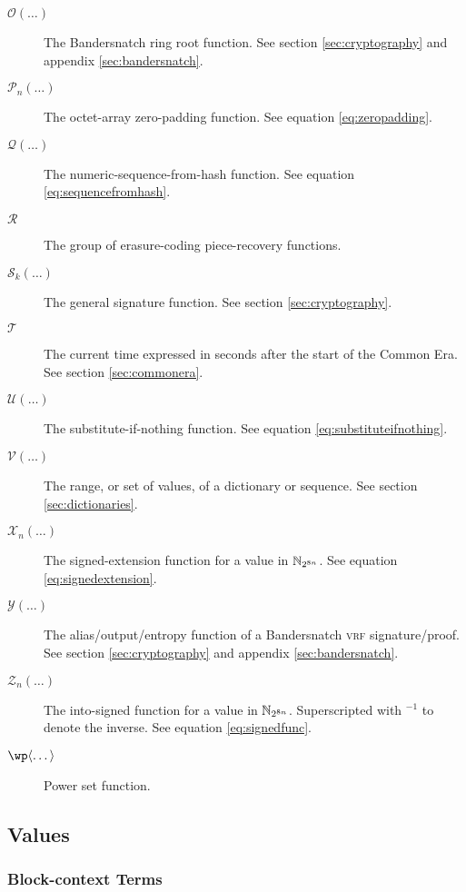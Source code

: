 \begin{description}
  \item[$\mathcal{O}(\dots)$] The Bandersnatch ring root function. See section \ref{sec:cryptography} and appendix \ref{sec:bandersnatch}.
  \item[$\mathcal{P}_n(\dots)$] The octet-array zero-padding function. See equation \ref{eq:zeropadding}.
  \item[$\mathcal{Q}(\dots)$] The numeric-sequence-from-hash function. See equation \ref{eq:sequencefromhash}.
  \item[$\mathcal{R}$] The group of erasure-coding piece-recovery functions.
  \item[$\mathcal{S}_k(\dots)$] The general signature function. See section \ref{sec:cryptography}.
  \item[$\mathcal{T}$] The current time expressed in seconds after the start of the \Jam Common Era. See section \ref{sec:commonera}.
  \item[$\mathcal{U}(\dots)$] The substitute-if-nothing function. See equation \ref{eq:substituteifnothing}.
  \item[$\mathcal{V}(\dots)$] The range, or set of values, of a dictionary or sequence. See section \ref{sec:dictionaries}.
  \item[$\mathcal{X}_n(\dots)$] The signed-extension function for a value in $\mathbb{N}_{2^{8n}}$. See equation \ref{eq:signedextension}.
  \item[$\mathcal{Y}(\dots)$] The alias/output/entropy function of a Bandersnatch \textsc{vrf} signature/proof. See section \ref{sec:cryptography} and appendix \ref{sec:bandersnatch}.
  \item[$\mathcal{Z}_n(\dots)$] The into-signed function for a value in $\mathbb{N}_{2^{8n}}$. Superscripted with ${}^{-1}$ to denote the inverse. See equation \ref{eq:signedfunc}.
  \item[$\powset{\dots}$] Power set function.
\end{description}

\subsection{Values}

\subsubsection{Block-context Terms}

